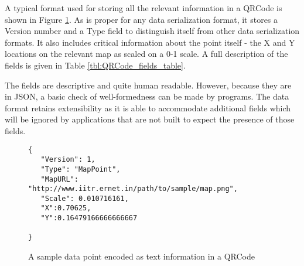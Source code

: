 A typical format used for storing all the relevant information in a QRCode is
shown in Figure \ref{fig:QRCode_info_format}. As is proper for any data 
serialization format, it stores a Version number and a Type field to 
distinguish itself from other data serialization formats. It also includes
critical information about the point itself - the X and Y locations on 
the relevant map as scaled on a 0-1 scale. A full description of the fields
is given in Table \ref{tbl:QRCode_fields_table}.

The fields are descriptive 
and quite human readable. However, because they are in JSON, a basic 
check of well-formedness can be made by programs. The data format retains 
extensibility as it is able to accommodate additional fields which will
be ignored by applications that are not built to expect the presence of those
fields.

\begin{figure}
    \centering
\begin{verbatim}
{
   "Version": 1,
   "Type": "MapPoint",
   "MapURL": "http://www.iitr.ernet.in/path/to/sample/map.png",
   "Scale": 0.010716161,
   "X":0.70625,
   "Y":0.16479166666666667 
   
}
\end{verbatim}
    \caption{A sample data point encoded as text information in a QRCode\label{fig:QRCode_info_format}}
\end{figure}

